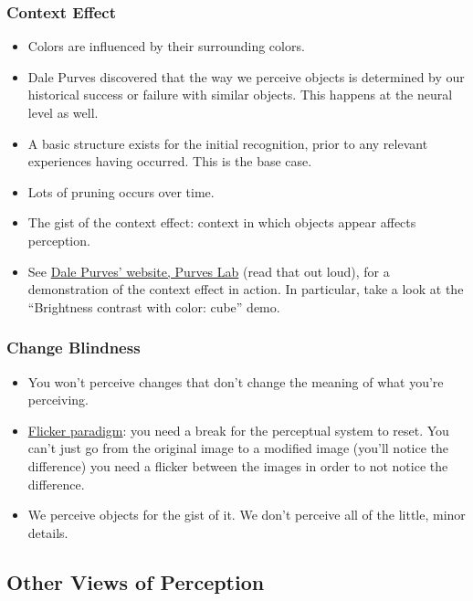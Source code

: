 \documentclass[]{article}
\newcommand{\lecture}[1]{\marginpar{{\footnotesize $\leftarrow$ \underline{#1}}}}
\begin{document}
			\subsubsection{Context Effect}
				\begin{itemize}
					\item Colors are influenced by their surrounding colors.
					\item Dale Purves discovered that the way we perceive objects is determined by our historical success or failure with similar objects. This happens at the neural level as well.
					\item A basic structure exists for the initial recognition, prior to any relevant experiences having occurred. This is the base case.
					\item Lots of pruning occurs over time.
					\item The gist of the context effect: context in which objects appear affects perception.
					\item See \href{http://www.purveslab.net/seeforyourself/}{Dale Purves' website, Purves Lab} (read that out loud), for a demonstration of the context effect in action. In particular, take a look at the ``Brightness contrast with color: cube'' demo.
				\end{itemize}

			\subsubsection{Change Blindness}
				\begin{itemize}
					\item You won't perceive changes that don't change the meaning of what you're perceiving.
					\item \underline{Flicker paradigm}: you need a break for the perceptual system to reset. You can't just go from the original image to a modified image (you'll notice the difference) \textendash{} you need a flicker between the images in order to not notice the difference.
					\item We perceive objects for the gist of it. We don't perceive all of the little, minor details.
				\end{itemize}
		\subsection{Other Views of Perception} \lecture{January 22, 2013}
\end{document}
